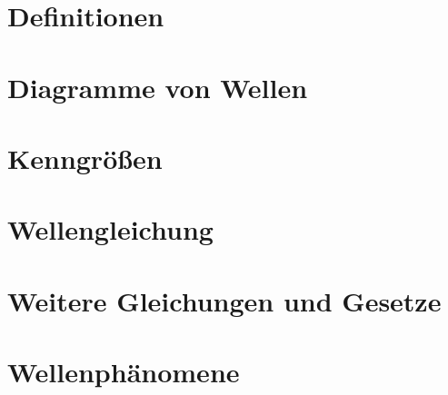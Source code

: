 \section{Definitionen} \label{sec:definition_wellen}


\section{Diagramme von Wellen} \label{sec:diagramm_wellen}


\section{Kenngrößen} \label{sec:kenngroessen_wellen}


\section{Wellengleichung} \label{sec:wellengleichung}


\section{Weitere Gleichungen und Gesetze} \label{sec:wellengleichung}


\section{Wellenphänomene} \label{sec:phaenomene_wellen}

